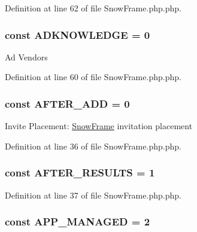 Definition at line 62 of file SnowFrame.php.php.

\hypertarget{classSnowFrame_a8f27b2443a3d8e68b4fc0a6fb0c97867}{
\subsubsection[{ADKNOWLEDGE}]{\setlength{\rightskip}{0pt plus 5cm}const {\bf ADKNOWLEDGE} = 0}}
\label{classSnowFrame_a8f27b2443a3d8e68b4fc0a6fb0c97867}
Ad Vendors 

Definition at line 60 of file SnowFrame.php.php.

\hypertarget{classSnowFrame_afdd7a2f6cda2469a1cc142c7ff18fadf}{
\subsubsection[{AFTER\_\-ADD}]{\setlength{\rightskip}{0pt plus 5cm}const {\bf AFTER\_\-ADD} = 0}}
\label{classSnowFrame_afdd7a2f6cda2469a1cc142c7ff18fadf}
Invite Placement: \hyperlink{classSnowFrame}{SnowFrame} invitation placement 

Definition at line 36 of file SnowFrame.php.php.

\hypertarget{classSnowFrame_a9502f339ccc1ac8f8338f324bd4dafb5}{
\subsubsection[{AFTER\_\-RESULTS}]{\setlength{\rightskip}{0pt plus 5cm}const {\bf AFTER\_\-RESULTS} = 1}}
\label{classSnowFrame_a9502f339ccc1ac8f8338f324bd4dafb5}


Definition at line 37 of file SnowFrame.php.php.

\hypertarget{classSnowFrame_ae1282c36cbc89a1a31d08ca4cc399c6d}{
\subsubsection[{APP\_\-MANAGED}]{\setlength{\rightskip}{0pt plus 5cm}const {\bf APP\_\-MANAGED} = 2}}
\label{classSnowFrame_ae1282c36cbc89a1a31d08ca4cc399c6d}


